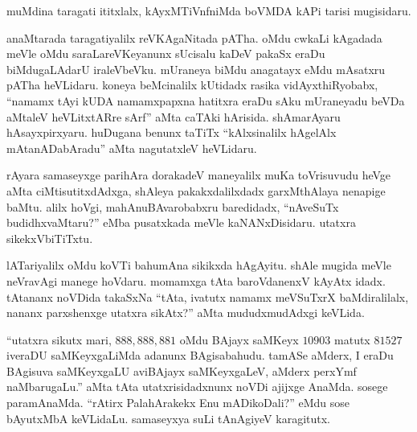 muMdina taragati ititxlalx, kAyxMTiVnfniMda boVMDA kAPi tarisi mugisidaru. 

\vskip 0.15cm

anaMtarada taragatiyalilx reVKAgaNitada pATha. oMdu cwkaLi kAgadada meVle oMdu saraLareVKeyanunx sUcisalu kaDeV pakaSx eraDu biMdugaLAdarU iraleVbeVku. mUraneya biMdu anagatayx eMdu mAsatxru pATha heVLidaru. koneya beMcinalilx kUtidadx rasika vidAyxthiRyobabx, ``namamx tAyi kUDA namamxpapxna hatitxra eraDu sAku mUraneyadu beVDa aMtaleV heVLitxtARre sArf'' aMta caTAki hArisida. shAmarAyaru hAsayxpirxyaru. huDugana benunx taTiTx ``kAlxsinalilx hAgelAlx mAtanADabAradu'' aMta nagutatxleV heVLidaru.

\vskip 0.15cm

rAyara samaseyxge parihAra dorakadeV maneyalilx muKa toVrisuvudu heVge aMta ciMtisutitxdAdxga, shAleya pakakxdalilxdadx garxMthAlaya nenapige baMtu. alilx hoVgi, mahAnuBAvarobabxru baredidadx, ``nAveSuTx budidhxvaMtaru?'' eMba pusatxkada meVle kaNANxDisidaru. utatxra sikekxVbiTiTxtu.

\vskip 0.15cm

lATariyalilx oMdu koVTi bahumAna sikikxda hAgAyitu. shAle mugida meVle neVravAgi manege hoVdaru. momamxga tAta baroVdanenxV kAyAtx idadx. tAtananx noVDida takaSxNa ``tAta, ivatutx namamx meVSuTxrX baMdiralilalx, nananx parxshenxge utatxra sikAtx?'' aMta mududxmudAdxgi keVLida.

\vskip 0.15cm

``utatxra sikutx mari, $888,888,881$ oMdu BAjayx saMKeyx $10903$ matutx $81527$ iveraDU saMKeyxgaLiMda adanunx BAgisabahudu. tamASe aMderx, I eraDu BAgisuva saMKeyxgaLU aviBAjayx saMKeyxgaLeV, aMderx perxYmf naMbarugaLu.'' aMta tAta utatxrisidadxnunx noVDi ajijxge AnaMda. sosege paramAnaMda. ``rAtirx PalahArakekx Enu mADikoDali?'' eMdu sose bAyutxMbA keVLidaLu. samaseyxya suLi tAnAgiyeV karagitutx.


